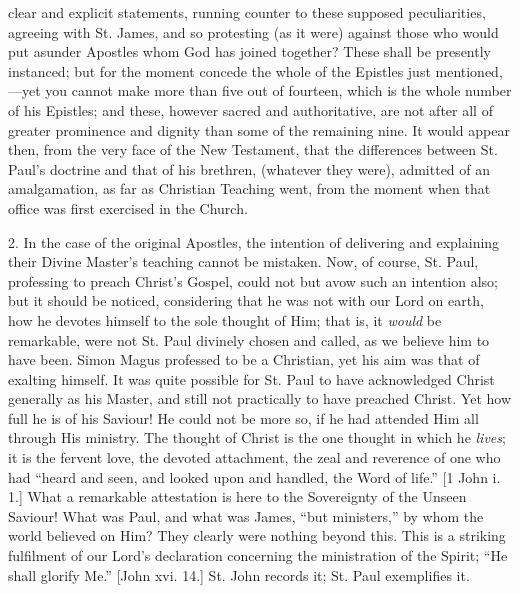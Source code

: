 clear and explicit statements, running counter to these supposed
peculiarities, agreeing with St. James, and so protesting (as it were)
against those who would put asunder Apostles whom God has joined
together? These shall be presently instanced; but for the moment concede
the whole of the Epistles just mentioned,—yet you cannot make more
than five out of fourteen, which is the whole number of his Epistles;
and these, however sacred and authoritative, are not after all of
greater prominence and dignity than some of the remaining nine. It would
appear then, from the very face of the New Testament, that the
differences between St. Paul's doctrine and that of his brethren,
(whatever they were), admitted of an amalgamation, as far as Christian
Teaching went, from the moment when that office was first exercised in
the Church.

2. In the case of the original Apostles, the intention of delivering
and explaining their Divine Master's teaching cannot be mistaken. Now,
of course, St. Paul, professing to preach Christ's Gospel, could not but
avow such an intention also; but it should be noticed, considering that
he was not with our Lord on earth, how he devotes himself to the sole
thought of Him; that is, it \emph{would} be remarkable, were not St.
Paul divinely chosen and called, as we believe him to have been. Simon
Magus professed to be a Christian, yet his aim was that of exalting
himself. It was quite possible for St. Paul to have acknowledged Christ
generally as his Master, and still not practically to have preached
Christ. Yet how full he is of his Saviour! He could not be more so, if
he had attended Him all through His ministry. The thought of Christ is
the one thought in which he \emph{lives}; it is the fervent love, the
devoted attachment, the zeal and reverence of one who had ``heard
and seen, and looked upon and handled, the Word of life.'' [1 John i.
1.] What a remarkable attestation is here to the Sovereignty of the
Unseen Saviour! What was Paul, and what was James, ``but
ministers,'' by whom the world believed on Him? They clearly were
nothing beyond this. This is a striking fulfilment of our Lord's
declaration concerning the ministration of the Spirit; ``He shall
glorify Me.'' [John xvi. 14.] St. John records it; St. Paul
exemplifies it.

